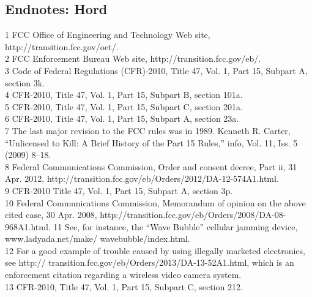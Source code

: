 \begin{itemize}
\begin{itemized}
\begin{itemize}
\section{Endnotes: Hord}
1 FCC Office of Engineering and Technology Web site, http://transition.fcc.gov/oet/.\\
2 FCC Enforcement Bureau Web site, http://transition.fcc.gov/eb/.\\
3 Code of Federal Regulations (CFR)-2010, Title 47, Vol. 1, Part 15, Subpart A, section 3k.\\
4 CFR-2010, Title 47, Vol. 1, Part 15, Subpart B, section 101a.\\
5 CFR-2010, Title 47, Vol. 1, Part 15, Subpart C, section 201a.\\
6 CFR-2010, Title 47, Vol. 1, Part 15, Subpart A, section 23a.\\
7 The last major revision to the FCC rules was in 1989. Kenneth R. Carter, ``Unlicensed to Kill: A
Brief History of the Part 15 Rules,'' info, Vol. 11, Iss. 5 (2009) 8–18.\\
8 Federal Communications Commission, Order and consent decree, Part ii, 31 Apr. 2012,
http://transition.fcc.gov/eb/Orders/2012/DA-12-574A1.html.\\
9 CFR-2010 Title 47, Vol. 1, Part 15, Subpart A, section 3p.\\
10 Federal Communications Commission, Memorandum of opinion on the above cited case, 30 Apr. 2008, http://transition.fcc.gov/eb/Orders/2008/DA-08-968A1.html.
11 See, for instance, the ``Wave Bubble'' cellular jamming device, www.ladyada.net/make/
wavebubble/index.html.\\
12 For a good example of trouble caused by using illegally marketed electronics, see http://
transition.fcc.gov/eb/Orders/2013/DA-13-52A1.html, which is an enforcement citation
regarding a wireless video camera system.\\
13 CFR-2010, Title 47, Vol. 1, Part 15, Subpart C, section 212.\\


\end{itemize}
\end{itemized}
\end{itemize}
